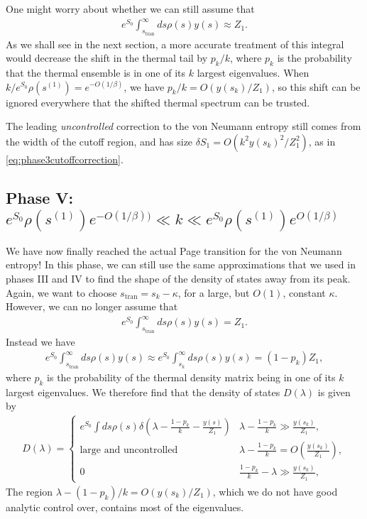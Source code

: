 \documentclass[12pt]{article}
\newcommand{\stran}{s_{\text{tran}}}
\newcommand{\smax}{s_k}
\numberwithin{equation}{section}
\begin{document}
One might worry about whether we can still assume that
\begin{align}
e^{S_0} \int_{\stran}^\infty ds \rho(s) y(s) \approx Z_1.
\end{align}
As we shall see in the next section, a more accurate treatment of this integral would decrease the shift in the thermal tail by $p_k/ k$, where $p_k$ is the probability that the thermal ensemble is in one of its $k$ largest eigenvalues. When $k/e^{S_0} \rho( s^{(1)}) = e^{-O(1/\beta)}$, we have $p_k/k = O( y(\smax)/Z_1)$, so this shift can be ignored everywhere that the shifted thermal spectrum can be trusted.

The leading \emph{uncontrolled} correction to the von Neumann entropy still comes from the width of the cutoff region, and has size $\delta S_1 =  O(k^2 y(\smax)^2/Z_1^2)$, as in \eqref{eq:phase3cutoffcorrection}.

\subsection*{Phase V: $e^{S_0} \rho( s^{(1)})e^{-O(1/\beta))} \ll k \ll e^{S_0} \rho( s^{(1)}) e^{O(1/\beta)}$}
We have now finally reached the actual Page transition for the von Neumann entropy! In this phase, we can still use the same approximations that we used in phases III and IV to find the shape of the density of states away from its peak. Again, we want to choose $\stran = \smax - \kappa$, for a large, but $O(1)$, constant $\kappa$. However, we can no longer assume that
\begin{align}
e^{S_0} \int_{\stran}^\infty ds \rho(s) y(s) = Z_1.
\end{align}
Instead we have
\begin{align}
e^{S_0} \int_{\stran}^\infty ds \rho(s) y(s) \approx e^{S_0} \int_{\smax}^\infty ds \rho(s) y(s) = (1 - p_k) Z_1,
\end{align}
where $p_k$ is the probability of the thermal density matrix being in one of its $k$ largest eigenvalues. We therefore find that the density of states $D(\lambda)$ is given by
\begin{align}
D(\lambda) = \begin{cases} 
      e^{S_0} \int ds \rho(s) \delta( \lambda - \frac{1-p_k}{k} - \frac{y(s)}{ Z_1}) & \lambda -\frac{1-p_k}{k} \gg \frac{y(\smax)}{Z_1}, \\
      \text{large and uncontrolled} & \lambda -\frac{1-p_k}{k} = O( \frac{y(\smax)}{Z_1}) ,\\
      0 &  \frac{1-p_k}{k} - \lambda \gg \frac{y(\smax)}{Z_1},
   \end{cases}
\end{align}
The region $\lambda - (1-p_k)/k = O( y(\smax)/Z_1)$, which we do not have good analytic control over, contains most of the eigenvalues. 
\end{document}
